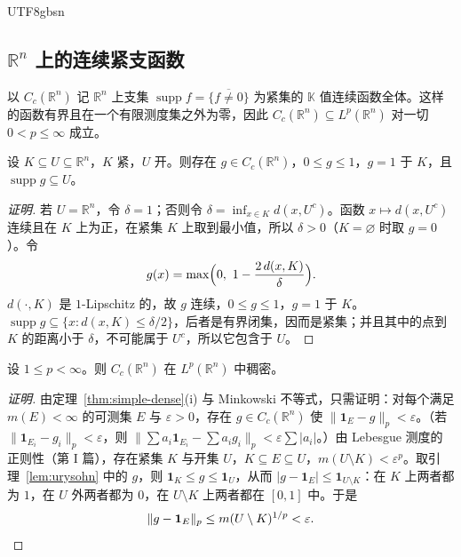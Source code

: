 \documentclass[11pt]{article}
\newcommand{\K}{\mathbb{K}}
\newcommand{\R}{\mathbb{R}}
\newcommand{\norm}[1]{\lVert #1\rVert}
\newcommand{\ind}{\mathbf{1}}
\DeclareMathOperator{\supp}{supp}
\begin{document}
\begin{CJK*}{UTF8}{gbsn}
\subsection{$\R^{n}$ 上的连续紧支函数}

以 $C_{c}(\R^{n})$ 记 $\R^{n}$ 上支集 $\supp f=\overline{\{f\ne0\}}$ 为紧集的 $\K$ 值连续函数全体。这样的函数有界且在一个有限测度集之外为零，因此 $C_{c}(\R^{n})\subseteq L^{p}(\R^{n})$ 对一切 $0<p\le\infty$ 成立。

\begin{lemma}[$\R^{n}$ 中的 Urysohn 引理]\label{lem:urysohn}
设 $K\subseteq U\subseteq\R^{n}$，$K$ 紧，$U$ 开。则存在 $g\in C_{c}(\R^{n})$，$0\le g\le1$，$g=1$ 于 $K$，且 $\supp g\subseteq U$。
\end{lemma}

\begin{proof}[证明]
若 $U=\R^{n}$，令 $\delta=1$；否则令 $\delta=\inf_{x\in K}d(x,U^{c})$。函数 $x\mapsto d(x,U^{c})$ 连续且在 $K$ 上为正，在紧集 $K$ 上取到最小值，所以 $\delta>0$（$K=\varnothing$ 时取 $g=0$）。令
\[
g(x)=\max\Bigl(0,\ 1-\frac{2\,d(x,K)}{\delta}\Bigr).
\]
$d(\cdot,K)$ 是 $1$-Lipschitz 的，故 $g$ 连续，$0\le g\le1$，$g=1$ 于 $K$。$\supp g\subseteq\{x:d(x,K)\le\delta/2\}$，后者是有界闭集，因而是紧集；并且其中的点到 $K$ 的距离小于 $\delta$，不可能属于 $U^{c}$，所以它包含于 $U$。
\end{proof}

\begin{theorem}\label{thm:Cc-dense}
设 $1\le p<\infty$。则 $C_{c}(\R^{n})$ 在 $L^{p}(\R^{n})$ 中稠密。
\end{theorem}

\begin{proof}[证明]
由定理~\ref{thm:simple-dense}(i) 与 Minkowski 不等式，只需证明：对每个满足 $m(E)<\infty$ 的可测集 $E$ 与 $\varepsilon>0$，存在 $g\in C_{c}(\R^{n})$ 使 $\norm{\ind_{E}-g}_{p}<\varepsilon$。（若 $\norm{\ind_{E_{i}}-g_{i}}_{p}<\varepsilon$，则 $\norm{\sum a_{i}\ind_{E_{i}}-\sum a_{i}g_{i}}_{p}<\varepsilon\sum|a_{i}|$。）由 Lebesgue 测度的正则性（第 I 篇），存在紧集 $K$ 与开集 $U$，$K\subseteq E\subseteq U$，$m(U\setminus K)<\varepsilon^{p}$。取引理~\ref{lem:urysohn} 中的 $g$，则 $\ind_{K}\le g\le\ind_{U}$，从而 $|g-\ind_{E}|\le\ind_{U\setminus K}$：在 $K$ 上两者都为 $1$，在 $U$ 外两者都为 $0$，在 $U\setminus K$ 上两者都在 $[0,1]$ 中。于是
\[
\norm{g-\ind_{E}}_{p}\le m(U\setminus K)^{1/p}<\varepsilon. \qedhere
\]
\end{proof}


\end{CJK*}
\end{document}
